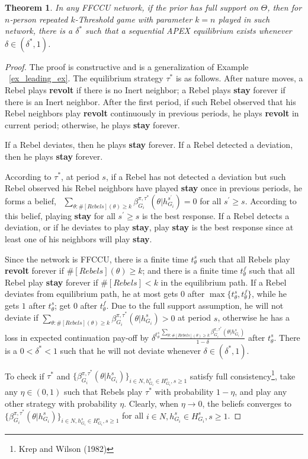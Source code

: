 \documentclass[12pt,letterpaper]{article}
\newtheorem{theorem}{Theorem}
\theoremstyle{definition}
\theoremstyle{remark}
\theoremstyle{claim}
\begin{document}
\begin{theorem}
\label{prop:not_crowded}
In any FFCCU network, if the prior has full support on $\Theta$, then for $n$-person repeated $k$-Threshold game with parameter $k=n$ played in such network,  there is a $\delta^{*}$ such that a sequential APEX equilibrium exists whenever $\delta\in (\delta^{*},1)$.
\end{theorem}
\begin{proof}
The proof is constructive and is a generalization of Example ~\ref{ex_leading_ex}. The equilibrium strategy $\tau^{*}$ is as follows. After nature moves, a Rebel plays \textbf{revolt}  if there is no Inert neighbor; a Rebel plays \textbf{stay} forever if there is an Inert neighbor. After the first period, if such Rebel observed that his Rebel neighbors play \textbf{revolt} continuously in previous periods, he plays \textbf{revolt} in current period; otherwise, he plays \textbf{stay} forever. 

If a Rebel deviates, then he plays \textbf{stay} forever. If a Rebel detected a deviation, then he plays \textbf{stay} forever.

According to $\tau^{*}$, at period $s$, if a Rebel has not detected a deviation but such Rebel observed his Rebel neighbors have played \textbf{stay} once in previous periods, he forms a belief, ~$\sum_{\theta:\#[Rebels](\theta)\geq k}\beta^{\pi,\tau^*}_{G_i}(\theta|h^{s^{'}}_{G_i})=0$ for all $s^{'}\geq s$. According to this belief, playing \textbf{stay} for all $s^{'} \geq s$ is the best response. If a Rebel detects a deviation, or if he deviates to play \textbf{stay}, play \textbf{stay} is the best response since at least one of his neighbors will play \textbf{stay}. 

Since the network is FFCCU, there is a finite time $t^{s}_{\theta}$ such that all Rebels play \textbf{revolt} forever if $\#[Rebels](\theta)\geq k$; and there is a finite time $t^f_{\theta}$ such that all Rebel play \textbf{stay} forever if $\#[Rebels]< k$ in the equilibrium path. If a Rebel deviates from equilibrium path, he at most gets 0 after $\max\{t^{s}_{\theta},t^f_{\theta}\}$, while he gets $1$ after $t^{s}_{\theta}$; get $0$ after $t^f_{\theta}$. Due to the full support assumption, he will not deviate if $\sum_{\theta:\#[Rebels](\theta)\geq k}\beta^{\pi,\tau^*}_{G_i}(\theta|h^{s}_{G_i})>0$ at period $s$, otherwise he has a loss in expected continuation pay-off by $\delta^{t^s_{\theta}}\frac{\sum_{\theta:\#[Rebels](\theta)\geq k}\beta^{\pi,\tau^*}_{G_i}(\theta|h^{s}_{G_i})}{1-\delta}$ after $t^s_{\theta}$. There is a $0<\delta^{*}<1$ such that he will not deviate whenever $\delta\in (\delta^{*},1)$.

To check if $\tau^{*}$ and $\{\beta^{\pi,\tau^*}_{G_i}(\theta|h^{s}_{G_i})\}_{i\in N, h^{s}_{G_i}\in H^{s}_{G_i},s\geq 1}$ satisfy full consistency\footnote{Krep and Wilson (1982)}, take any $\eta\in (0,1)$ such that Rebels play $\tau^{*}$ with probability $1-\eta$, and play any other strategy with probability $\eta$. Clearly, when $\eta \rightarrow 0$, the beliefs converges to $\{\beta^{\pi,\tau^*}_{G_i}(\theta|h^{s}_{G_i})\}_{i\in N, h^{s}_{G_i}\in H^{s}_{G_i},s\geq 1}$ for all $i\in N, h^{s}_{G_i}\in H^{s}_{G_i},s\geq 1$.
\end{proof}
\end{document}
